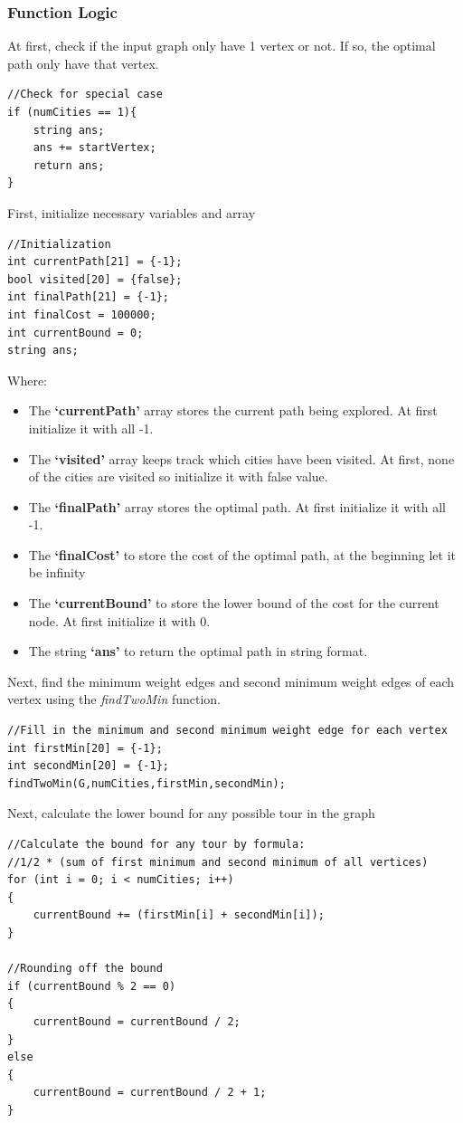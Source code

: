 \documentclass[a4paper]{article}
\begin{document}
\subsubsection{Function Logic}
At first, check if the input graph only have 1 vertex or not. If so, the optimal path only have that vertex.
\begin{verbatim}
//Check for special case
if (numCities == 1){
    string ans;
    ans += startVertex;
    return ans;
}
\end{verbatim}
First, initialize necessary variables and array
\begin{verbatim}
//Initialization
int currentPath[21] = {-1};
bool visited[20] = {false};
int finalPath[21] = {-1};
int finalCost = 100000;
int currentBound = 0;
string ans;
\end{verbatim}
Where:
\begin{itemize}
    \item The \textbf{`currentPath'} array stores the current path being explored. At first initialize it with all -1.
    \item The \textbf{`visited'} array keeps track which cities have been visited. At first, none of the cities are visited so initialize it with false value.
    \item The \textbf{`finalPath'} array stores the optimal path. At first initialize it with all -1.
    \item The \textbf{`finalCost'} to store the cost of the optimal path, at the beginning let it be infinity
    \item The \textbf{`currentBound'} to store the lower bound of the cost for the current node. At first initialize it with 0.
    \item The string \textbf{`ans'} to return the optimal path in string format.
\end{itemize}
Next, find the minimum weight edges and second minimum weight edges of each vertex using the \textit{findTwoMin} function.
\begin{verbatim}
//Fill in the minimum and second minimum weight edge for each vertex
int firstMin[20] = {-1};
int secondMin[20] = {-1};
findTwoMin(G,numCities,firstMin,secondMin);
\end{verbatim}
Next, calculate the lower bound for any possible tour in the graph
\begin{verbatim}
//Calculate the bound for any tour by formula:
//1/2 * (sum of first minimum and second minimum of all vertices)
for (int i = 0; i < numCities; i++)
{
    currentBound += (firstMin[i] + secondMin[i]);
}

//Rounding off the bound
if (currentBound % 2 == 0)
{
    currentBound = currentBound / 2;
}
else
{
    currentBound = currentBound / 2 + 1;
}
\end{verbatim}
\end{document}
